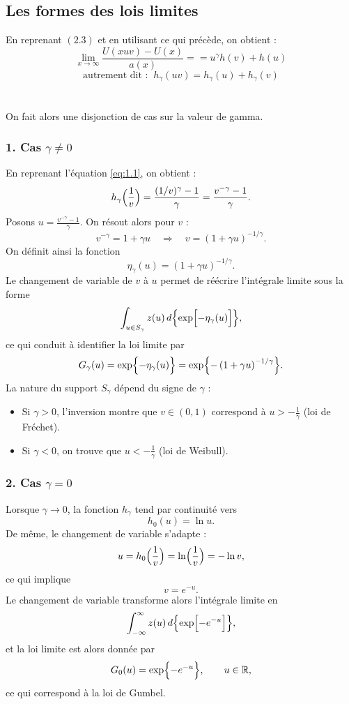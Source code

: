 \documentclass{article}
\begin{document}
\subsection{Les formes des lois limites}
En reprenant $(2.3)$ et en utilisant ce qui précède, on obtient :
\[
\lim_{x\to \infty} \frac{U(xuv) - U(x)}{a(x)} = = u^{\gamma} h(v) + h(u)
\]
\[
\text{autrement dit :} \; \; h_{\gamma}(uv)= h_{\gamma}(u) + h_{\gamma}(v)
\]
\\
\\
On fait alors une disjonction de cas sur la valeur de gamma.
\\
\subsubsection{1. Cas \(\gamma\neq0\)}

En reprenant l'équation \eqref{eq:1.1}, on obtient :
\[
h_\gamma\Bigl(\frac{1}{v}\Bigr)=\frac{(1/v)^\gamma-1}{\gamma}=\frac{v^{-\gamma}-1}{\gamma}.
\]
Posons \(u=\frac{v^{-\gamma}-1}{\gamma}\). On résout alors pour \(v\) :
\[
v^{-\gamma}=1+\gamma u\quad\Longrightarrow\quad v=(1+\gamma u)^{-1/\gamma}.
\]
On définit ainsi la fonction
\[
\eta_\gamma(u)=(1+\gamma u)^{-1/\gamma}.
\]
Le changement de variable de \(v\) à \(u\) permet de réécrire l'intégrale limite sous la forme
\[
\int_{u\in S_\gamma} z(u)\,d\Bigl\{\exp\Bigl[-\eta_\gamma(u)\Bigr]\Bigr\},
\]
ce qui conduit à identifier la loi limite par
\[
G_\gamma(u)=\exp\Bigl\{-\eta_\gamma(u)\Bigr\}=\exp\Bigl\{-\left(1+\gamma u\right)^{-1/\gamma}\Bigr\}.
\]
La nature du support \(S_\gamma\) dépend du signe de \(\gamma\) :
\begin{itemize}
    \item Si \(\gamma>0\), l'inversion montre que \(v\in(0,1)\) correspond à \(u>-\frac{1}{\gamma}\) (loi de Fréchet).
    \item Si \(\gamma<0\), on trouve que \(u<-\frac{1}{\gamma}\) (loi de Weibull).
\end{itemize}
\subsubsection{2. Cas \(\gamma=0\)}
Lorsque \(\gamma\to0\), la fonction \(h_\gamma\) tend par continuité vers
\[
h_0(u)=\ln u.
\]
De même, le changement de variable s'adapte : 
\[
u=h_0\Bigl(\frac{1}{v}\Bigr)=\ln\Bigl(\frac{1}{v}\Bigr)=-\ln v,
\]
ce qui implique
\[
v=e^{-u}.
\]
Le changement de variable transforme alors l'intégrale limite en
\[
\int_{-\infty}^{\infty} z(u)\,d\Bigl\{\exp\Bigl[-e^{-u}\Bigr]\Bigr\},
\]
et la loi limite est alors donnée par
\[
G_0(u)=\exp\Bigl\{-e^{-u}\Bigr\},\qquad u\in\mathbb{R},
\]
ce qui correspond à la loi de Gumbel.
\\
\end{document}
